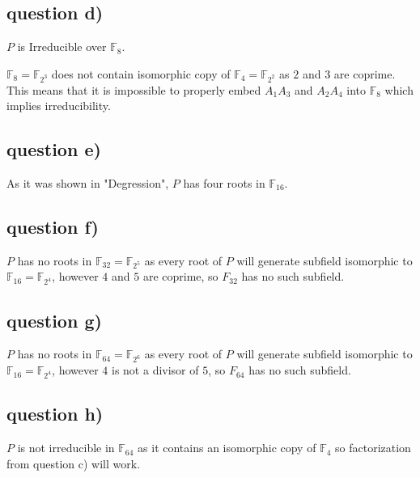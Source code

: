 \documentclass[12pt]{article}
\begin{document}
\subsection*{question d)}
$P$ is Irreducible over $\mathbb{F}_8$.

$\mathbb{F}_8 = \mathbb{F}_{2^3}$ does not contain isomorphic copy of 
$\mathbb{F}_{4} = \mathbb{F}_{2^2}$ as $2$ and $3$ are coprime.
This means that it is impossible to properly embed $A_1A_3$ and $A_2A_4$ into $\mathbb{F}_8$ which implies irreducibility. 
\subsection*{question e)} 
As it was shown in  "Degression", $P$ has four roots in $\mathbb{F}_{16}$.
\subsection*{question f)}
 $P$ has no roots in $\mathbb{F}_{32} = \mathbb{F}_{2^5}$ as every root of $P$ will generate subfield isomorphic to $\mathbb{F}_{16} = \mathbb{F}_{2^4}$, however $4$ and $5$ are coprime, so $F_{32}$ has no such subfield.
\subsection*{question g)} 
 $P$ has no roots in $\mathbb{F}_{64} = \mathbb{F}_{2^6}$ as every root of 
$P$ will generate subfield isomorphic to 
$\mathbb{F}_{16} = \mathbb{F}_{2^4}$, however $4$ is not a 
divisor of  $5$, so $F_{64}$ has no such subfield.

\subsection*{question h)}
$P$ is not irreducible in $\mathbb{F}_{64}$ as it contains an isomorphic copy of $\mathbb{F}_{4}$ so factorization from question c) will work.
\end{document}
